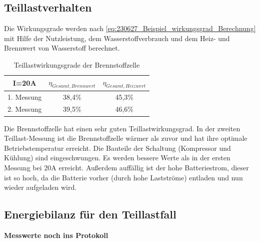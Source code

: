 \subsection{}




\subsection{Teillastverhalten}

Die Wirkungsgrade werden nach \autoref{eq:230627_Beispiel_wirkungsgrad_Berechnung} mit Hilfe der Nutzleistung, dem Wasserstoffverbrauch und dem Heiz- und Brennwert von Wasserstoff berechnet. 

\begin{table}[H]
    \caption{Teillastwirkungsgrade der Brennstoffzelle}
    \centering
        \begin{tabular}[pos]{|c|c|c|}
            \hline
            \rowcolor[HTML]{70AD47} 
            I=20A   & $\eta_{Gesamt,Brennwert}$               & $\eta_{Gesamt,Heizwert}$   \\\hline\hline
            1. Messung  & 38,4\%                            & 45,3\%                            \\
            2. Messung  & 39,5\%                            & 46,6\%                            \\\hline
        \end{tabular}
        \label{tab:20230628_Teillastwirkungsgrade}
\end{table}

Die Brennstoffzelle hat einen sehr guten Teillastwirkungsgrad. In der zweiten Teillast-Messung ist die Brennstoffzelle wärmer als zuvor und hat ihre optimale Betriebstemperatur erreicht. Die Bauteile der Schaltung (Kompressor und Kühlung) sind eingeschwungen. Es werden bessere Werte als in der ersten Messung bei 20A erreicht. Außerdem auffällig ist der hohe Batteriestrom, dieser ist so hoch, da die Batterie vorher (durch hohe Lastströme) entladen und nun wieder aufgeladen wird. 


\subsection{Energiebilanz für den Teillastfall}

\textbf{Messwerte noch ins Protokoll}